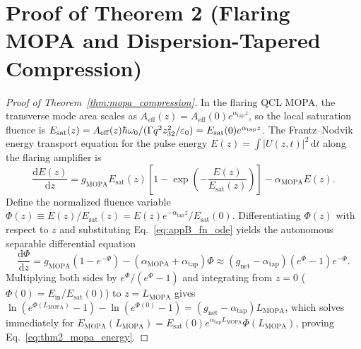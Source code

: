 \documentclass[11pt,letterpaper]{article}
\renewcommand{\hbar}{\mathchar'26\mkern-9mu h}
\begin{document}
\section{Proof of Theorem 2 (Flaring MOPA and Dispersion-Tapered Compression)}
\label{app:proof_thm2}

\begin{proof}[Proof of Theorem~\ref{thm:mopa_compression}]
In the flaring QCL MOPA, the transverse mode area scales as $A_{\mathrm{eff}}(z) = A_{\mathrm{eff}}(0)e^{\alpha_{\mathrm{tap}} z}$, so the local saturation fluence is $E_{\mathrm{sat}}(z) = A_{\mathrm{eff}}(z)\hbar\omega_0 / (\Gamma q^2 z_{32}^2 / \varepsilon_0) = E_{\mathrm{sat}}(0)e^{\alpha_{\mathrm{tap}} z}$. The Frantz--Nodvik energy transport equation for the pulse energy $E(z) = \int |U(z, t)|^2\,\mathrm{d}t$ along the flaring amplifier is
\begin{equation}
\frac{\mathrm{d}E(z)}{\mathrm{d}z} = g_{\mathrm{MOPA}} E_{\mathrm{sat}}(z)\left[ 1 - \exp\!\left(-\frac{E(z)}{E_{\mathrm{sat}}(z)}\right) \right] - \alpha_{\mathrm{MOPA}} E(z).
\label{eq:appB_fn_ode}
\end{equation}
Define the normalized fluence variable $\Phi(z) \equiv E(z)/E_{\mathrm{sat}}(z) = E(z)e^{-\alpha_{\mathrm{tap}} z}/E_{\mathrm{sat}}(0)$. Differentiating $\Phi(z)$ with respect to $z$ and substituting Eq.~\eqref{eq:appB_fn_ode} yields the autonomous separable differential equation
\begin{equation}
\frac{\mathrm{d}\Phi}{\mathrm{d}z} = g_{\mathrm{MOPA}}\left(1 - e^{-\Phi}\right) - \left(\alpha_{\mathrm{MOPA}} + \alpha_{\mathrm{tap}}\right)\Phi \approx \left(g_{\mathrm{net}} - \alpha_{\mathrm{tap}}\right)\left(e^\Phi - 1\right)e^{-\Phi}.
\label{eq:appB_separable}
\end{equation}
Multiplying both sides by $e^\Phi / (e^\Phi - 1)$ and integrating from $z = 0$ ($\Phi(0) = E_{\mathrm{in}}/E_{\mathrm{sat}}(0)$) to $z = L_{\mathrm{MOPA}}$ gives $\ln(e^{\Phi(L_{\mathrm{MOPA}})} - 1) - \ln(e^{\Phi(0)} - 1) = (g_{\mathrm{net}} - \alpha_{\mathrm{tap}})L_{\mathrm{MOPA}}$, which solves immediately for $E_{\mathrm{MOPA}}(L_{\mathrm{MOPA}}) = E_{\mathrm{sat}}(0)e^{\alpha_{\mathrm{tap}}L_{\mathrm{MOPA}}}\Phi(L_{\mathrm{MOPA}})$, proving Eq.~\eqref{eq:thm2_mopa_energy}.


\end{proof}
\end{document}
